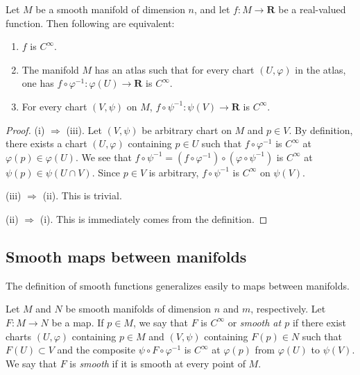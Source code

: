 \begin{proposition}\label{lem:characterisation of smooth real-valued functions}
    Let $M$ be a smooth manifold of dimension $n$, and let $f : M \to \mathbf{R}$ be a real-valued function. Then following are equivalent:
    \begin{enumerate}
        \item $f$ is $C^\infty$.
        \item The manifold $M$ has an atlas such that for every chart $(U, \varphi)$ in the atlas, one has $f \circ \varphi^{-1} : \varphi(U) \to \mathbf{R}$ is $C^\infty$.
        \item For every chart $(V, \psi)$ on $M$, $f \circ \psi^{-1} : \psi(V) \to \mathbf{R}$ is $C^\infty$.
    \end{enumerate}
\end{proposition}

\begin{proof}
    (i) $\Rightarrow$ (iii). Let $(V, \psi)$ be arbitrary chart on $M$ and $p \in V$. By definition, there exists a chart $(U, \varphi)$ containing $p \in U$ such that $f \circ \varphi^{-1}$ is $C^\infty$ at $\varphi(p) \in \varphi(U)$. We see that $f \circ \psi^{-1} = (f \circ \varphi^{-1}) \circ (\varphi \circ \psi^{-1})$ is $C^\infty$ at $\psi(p) \in \psi(U \cap V)$. Since $p \in V$ is arbitrary, $f \circ \psi^{-1}$ is $C^\infty$ on $\psi(V)$.

    (iii) $\Rightarrow$ (ii). This is trivial.

    (ii) $\Rightarrow$ (i). This is immediately comes from the definition.
\end{proof}

\subsection{Smooth maps between manifolds}

The definition of smooth functions generalizes easily to maps between manifolds.

\begin{definition}
    Let $M$ and $N$ be smooth manifolds of dimension $n$ and $m$, respectively. Let $F : M \to N$ be a map. If $p \in M$, we say that $F$ is $C^\infty$ or \emph{smooth at $p$} if there exist charts $(U, \varphi)$ containing $p \in M$ and $(V, \psi)$ containing $F(p) \in N$ such that $F(U) \subset V$ and the composite $\psi \circ F \circ \varphi^{-1}$ is $C^\infty$ at $\varphi(p)$ from $\varphi(U)$ to $\psi(V)$. We say that $F$ is \emph{smooth} if it is smooth at every point of $M$.
\end{definition}

